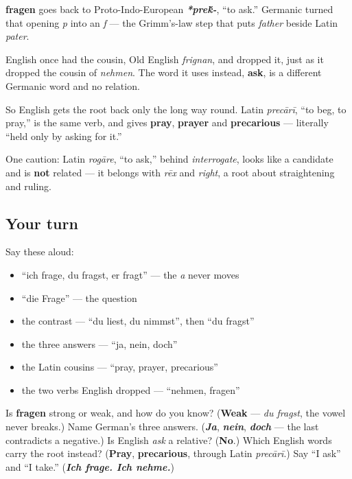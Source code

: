 \begin{cousinweb}
\textbf{fragen} goes back to Proto-Indo-European \emph{\textbf{*pre\'{k}-}}, \textquotedblleft{}to ask.\textquotedblright{} Germanic turned that opening \emph{p} into an \emph{f} — the Grimm's-law step that puts \emph{father} beside Latin \emph{pater}.

English once had the cousin, Old English \emph{frignan}, and dropped it, just as it dropped the cousin of \emph{nehmen}. The word it uses instead, \textbf{ask}, is a different Germanic word and no relation.

So English gets the root back only the long way round. Latin \emph{precārī}, \textquotedblleft{}to beg, to pray,\textquotedblright{} is the same verb, and gives \textbf{pray}, \textbf{prayer} and \textbf{precarious} — literally \textquotedblleft{}held only by asking for it.\textquotedblright{}

One caution: Latin \emph{rogāre}, \textquotedblleft{}to ask,\textquotedblright{} behind \emph{interrogate}, looks like a candidate and is \textbf{not} related — it belongs with \emph{rēx} and \emph{right}, a root about straightening and ruling.
\end{cousinweb}

\subsection*{Your turn}
Say these aloud:

\begin{itemize}
\raggedright
  \item \textquotedblleft{}ich frage, du fragst, er fragt\textquotedblright{} — the \emph{a} never moves
  \item \textquotedblleft{}die Frage\textquotedblright{} — the question
  \item the contrast — \textquotedblleft{}du liest, du nimmst\textquotedblright{}, then \textquotedblleft{}du fragst\textquotedblright{}
  \item the three answers — \textquotedblleft{}ja, nein, doch\textquotedblright{}
  \item the Latin cousins — \textquotedblleft{}pray, prayer, precarious\textquotedblright{}
  \item the two verbs English dropped — \textquotedblleft{}nehmen, fragen\textquotedblright{}
\end{itemize}

\begin{tcolorbox}[breakable,colback=teal!4,colframe=teal!35!black,title={Before you move on}]
Is \textbf{fragen} strong or weak, and how do you know? (\textbf{Weak} — \emph{du fragst}, the vowel never breaks.) Name German's three answers. (\emph{\textbf{Ja}}, \emph{\textbf{nein}}, \emph{\textbf{doch}} — the last contradicts a negative.) Is English \emph{ask} a relative? (\textbf{No}.) Which English words carry the root instead? (\textbf{Pray}, \textbf{precarious}, through Latin \emph{precārī}.) Say \textquotedblleft{}I ask\textquotedblright{} and \textquotedblleft{}I take.\textquotedblright{} (\emph{\textbf{Ich frage. Ich nehme.}})
\end{tcolorbox}
